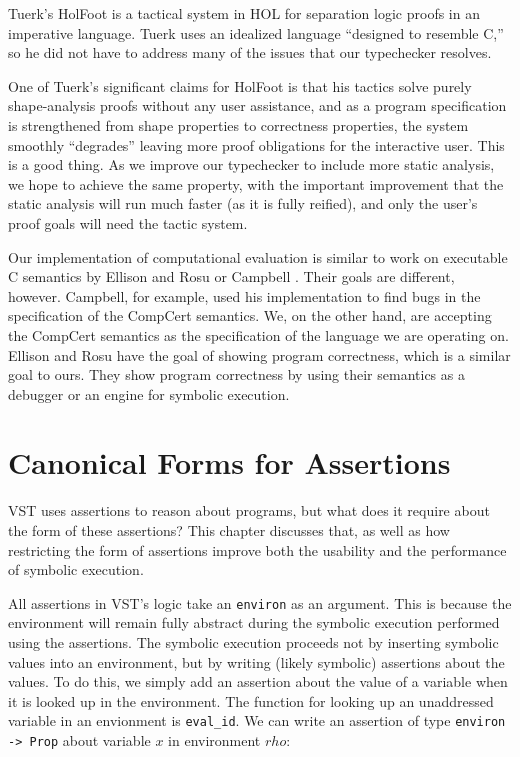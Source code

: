 \documentclass{puthesis}
\begin{document}
Tuerk's HolFoot \cite{Tuer09} is a tactical system in HOL for
separation logic proofs in an imperative language.  Tuerk uses an
idealized language ``designed to resemble C,'' so he did not have to
address many of the issues that our typechecker resolves.

One of Tuerk's significant claims for HolFoot is that his tactics
solve purely shape-analysis proofs without any user assistance, and as
a program specification is strengthened from shape properties to
correctness properties, the system smoothly ``degrades'' leaving more
proof obligations for the interactive user.  This is a good thing.  As
we improve our typechecker to include more static analysis, we hope to
achieve the same property, with the important improvement that the
static analysis will run much faster (as it is fully reified), and
only the user's proof goals will need the tactic system.

Our implementation of computational evaluation is similar to work on
executable C semantics by Ellison and Rosu \cite{ellison-rosu-2012-popl} or
Campbell \cite{Campbell-cpp-12}. Their goals are different, however.
Campbell, for example, used his implementation to find bugs in the
specification of the CompCert semantics. We, on the other hand, are accepting
the CompCert semantics as the specification of the language we are operating
on. Ellison and Rosu have the goal of showing program correctness, which is a 
similar goal to ours. They show program correctness by using their semantics as
a debugger or an engine for symbolic execution. 


\chapter{Canonical Forms for Assertions}
\label{ch:canonical}

VST uses assertions to reason about programs, but what does it require
about the form of these assertions? This chapter discusses that, as
well as how restricting the form of assertions improve both the
usability and the performance of symbolic execution.

All assertions in VST's logic take an \lstinline|environ| as an
argument. This is because the environment will remain fully abstract
during the symbolic execution performed using the assertions. The
symbolic execution proceeds not by inserting symbolic values into an
environment, but by writing (likely symbolic) assertions about the
values. To do this, we simply add an assertion about the value of a
variable when it is looked up in the environment. The function for
looking up an unaddressed variable in an envionment is
\lstinline|eval_id|. We can write an assertion of type
\lstinline|environ -> Prop| about variable $x$ in environment $rho$:
\end{document}
